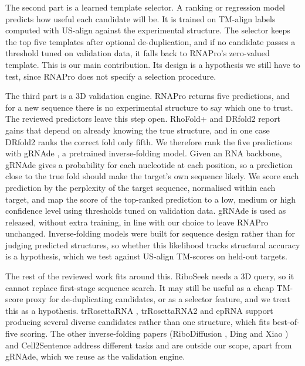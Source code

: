 \documentclass{FastFyp}
\begin{document}
The second part is a learned template selector. A ranking or regression model predicts how useful each candidate will be. It is trained on TM-align labels computed with US-align against the experimental structure. The selector keeps the top five templates after optional de-duplication, and if no candidate passes a threshold tuned on validation data, it falls back to RNAPro's zero-valued template. This is our main contribution. Its design is a hypothesis we still have to test, since RNAPro does not specify a selection procedure.

The third part is a 3D validation engine. RNAPro returns five predictions, and for a new sequence there is no experimental structure to say which one to trust. The reviewed predictors leave this step open. RhoFold+ \cite{ref:Shen:2024} and DRfold2 \cite{ref:Li:2026} report gains that depend on already knowing the true structure, and in one case DRfold2 ranks the correct fold only fifth. We therefore rank the five predictions with gRNAde \cite{joshi2025grnade}, a pretrained inverse-folding model. Given an RNA backbone, gRNAde gives a probability for each nucleotide at each position, so a prediction close to the true fold should make the target's own sequence likely. We score each prediction by the perplexity of the target sequence, normalised within each target, and map the score of the top-ranked prediction to a low, medium or high confidence level using thresholds tuned on validation data. gRNAde is used as released, without extra training, in line with our choice to leave RNAPro unchanged. Inverse-folding models were built for sequence design rather than for judging predicted structures, so whether this likelihood tracks structural accuracy is a hypothesis, which we test against US-align TM-scores on held-out targets.

The rest of the reviewed work fits around this. RiboSeek \cite{wang2026riboseek} needs a 3D query, so it cannot replace first-stage sequence search. It may still be useful as a cheap TM-score proxy for de-duplicating candidates, or as a selector feature, and we treat this as a hypothesis. trRosettaRNA \cite{wang2023trrosettarna}, trRosettaRNA2 \cite{wang2026trrosettarna2} and epRNA \cite{sha2024eprna} support producing several diverse candidates rather than one structure, which fits best-of-five scoring. The other inverse-folding papers (RiboDiffusion \cite{huang2024ribodiffusion}, Ding and Xiao \cite{ding2025inverse}) and Cell2Sentence \cite{levine2024cell2sentence} address different tasks and are outside our scope, apart from gRNAde, which we reuse as the validation engine.
\end{document}
